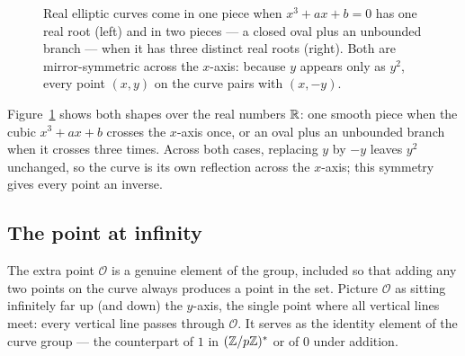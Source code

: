 \begin{figure}[htbp]
\caption{Real elliptic curves come in one piece when $x^3 + ax + b = 0$ has one real root
(left) and in two pieces --- a closed oval plus an unbounded branch --- when it has three
distinct real roots (right). Both are mirror-symmetric across the $x$-axis: because $y$
appears only as $y^2$, every point $(x,y)$ on the curve pairs with $(x,-y)$.}
\label{ch21:realcurve}
\end{figure}

Figure~\ref{ch21:realcurve} shows both shapes over the real numbers $\mathbb{R}$: one smooth piece
when the cubic $x^3 + ax + b$ crosses the $x$-axis once, or an oval plus an unbounded
branch when it crosses three times. Across both cases, replacing $y$ by $-y$ leaves $y^2$
unchanged, so the curve is its own reflection across the $x$-axis; this symmetry gives
every point an inverse.

\subsection{The point at infinity}

The extra point $\mathcal{O}$ is a genuine element of the group, included so that adding
any two points on the curve always produces a point in the set. Picture $\mathcal{O}$ as
sitting infinitely far up (and down) the $y$-axis, the single point where all vertical
lines meet: every vertical line passes through $\mathcal{O}$. It serves as the identity
element of the curve group --- the counterpart of $1$ in $(\mathbb{Z}/p\mathbb{Z})^{*}$ or of $0$ under
addition.

